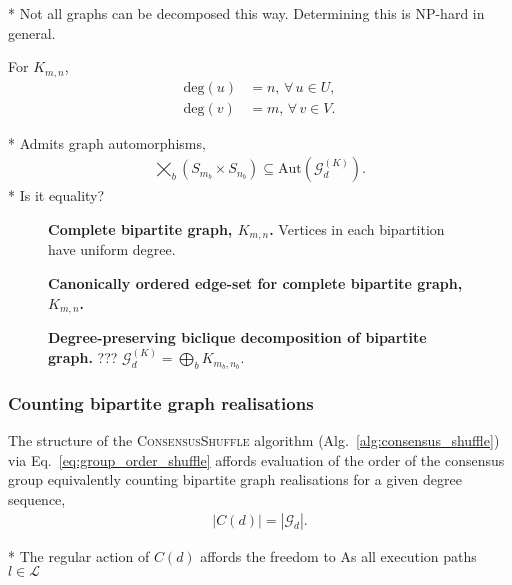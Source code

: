 \documentclass[twocolumn, aps, amsmath, amssymb, nofootinbib, superscriptaddress, longbibliography, floatfix, eqsecnum, rmp]{revtex4-2}
\begin{document}
* Not all graphs can be decomposed this way. Determining this is NP-hard in general.

For $K_{m,n}$,
\begin{align}
	\mathrm{deg}(u)&=n,\,\forall\, u\in U,\nonumber\\
	\mathrm{deg}(v)&=m,\,\forall\, v\in V.
\end{align}

* Admits graph automorphisms,
\begin{align}
	\bigtimes_{b} (S_{m_b}\times S_{n_b}) \subseteq \mathrm{Aut}(\mathcal{G}_d^{(K)}).
\end{align}
* Is it equality?

\begin{figure}[!htb]
	
	\caption{\textbf{Complete bipartite graph, $K_{m,n}$.} Vertices in each bipartition have uniform degree.} \label{fig:K_mn_graph}
\end{figure}

\begin{figure}[!htb]
	
	\caption{\textbf{Canonically ordered edge-set for complete bipartite graph, $K_{m,n}$.}} \label{fig:K_mn_edges}
\end{figure}

\begin{figure}[!htb]
	
	\caption{\textbf{Degree-preserving biclique decomposition of bipartite graph.} ??? \mbox{$\mathcal{G}_d^{(K)}=\bigoplus_b K_{m_b,n_b}$.}} \label{fig:K_mn_decomp}
\end{figure}

\subsubsection{Counting bipartite graph realisations} \label{sec:count_real}

The structure of the \textsc{ConsensusShuffle} algorithm (Alg.~\ref{alg:consensus_shuffle}) via Eq.~\eqref{eq:group_order_shuffle} affords evaluation of the order of the consensus group equivalently counting bipartite graph realisations for a given degree sequence,
\begin{align}
	|C(d)| = |\mathcal{G}_d|.
\end{align}

* The regular action of $C(d)$ affords the freedom to As all execution paths $l\in\mathcal{L}$
\end{document}
